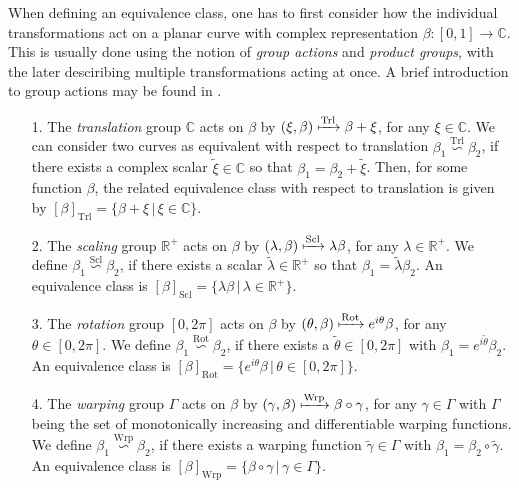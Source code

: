 When defining an equivalence class, one has to first consider how the individual transformations act on a planar curve with complex representation $\beta : [0,1] \rightarrow \mathbb{C}$.
This is usually done using the notion of \textit{group actions} and \textit{product groups}, with the later desciribing multiple transformations acting at once.
A brief introduction to group actions may be found in \cite[Chap.\ 3]{SrivastavaKlassen2016}.
\begin{itemize}[leftmargin=0.75cm]
  \item[1.]
    The \emph{translation} group $\mathbb{C}$ acts on $\beta$ by $(\xi, \beta) \xmapsto{\text{Trl}} \beta + \xi$, for any $\xi \in \mathbb{C}$.
    We can consider two curves as equivalent with respect to translation $\beta_1 \overset{\text{Trl}}{\backsim} \beta_2$, if there exists a complex scalar $\widetilde\xi \in \mathbb{C}$ so that $\beta_1 = \beta_2  + \widetilde\xi$.
    Then, for some function $\beta$, the related equivalence class with respect to translation is given by $[\beta]_{\text{Trl}} = \{\beta + \xi\, |\, \xi \in \mathbb{C}\}$.
  \item[2.] 
    The \emph{scaling} group $\mathbb{R}^+$ acts on $\beta$ by $(\lambda, \beta) \xmapsto{\text{Scl}} \lambda \beta$, for any $\lambda \in \mathbb{R}^+$.
    We define $\beta_1 \overset{\text{Scl}}{\backsim} \beta_2$, if there exists a scalar $\widetilde\lambda \in \mathbb{R}^+$ so that $\beta_1 = \widetilde\lambda \beta_2$.
    An equivalence class is $[\beta]_{\text{Scl}} = \{\lambda\beta\,|\, \lambda \in \mathbb{R}^+\}$.
  \item[3.] 
    The \emph{rotation} group $[0,2\pi]$ acts on $\beta$ by $(\theta, \beta) \xmapsto{\text{Rot}}  e^{i\theta} \beta$, for any $\theta \in [0,2\pi]$.
    We define $\beta_1 \overset{\text{Rot}}{\backsim} \beta_2$, if there exists a $\widetilde\theta \in [0,2\pi]$ with $\beta_1 = e^{i\widetilde\theta} \beta_2$.
    An equivalence class is $[\beta]_{\text{Rot}} = \{e^{i\theta}\beta\,|\, \theta \in [0,2\pi]\}$.
  \item[4.] 
    The \emph{warping} group $\Gamma$ acts on $\beta$ by $(\gamma,\beta) \xmapsto{\text{Wrp}} \beta \circ \gamma$, for any $\gamma \in \Gamma$ with $\Gamma$ being the set of monotonically increasing and differentiable warping functions.
    We define $\beta_1 \overset{\text{Wrp}}{\backsim} \beta_2$, if there exists a warping function $\widetilde\gamma \in \Gamma$ with $\beta_1 = \beta_2 \circ \widetilde\gamma$.
    An equivalence class is $[\beta]_{\text{Wrp}} = \{\beta \circ \gamma\,|\, \gamma \in \Gamma\}$.
\end{itemize}
